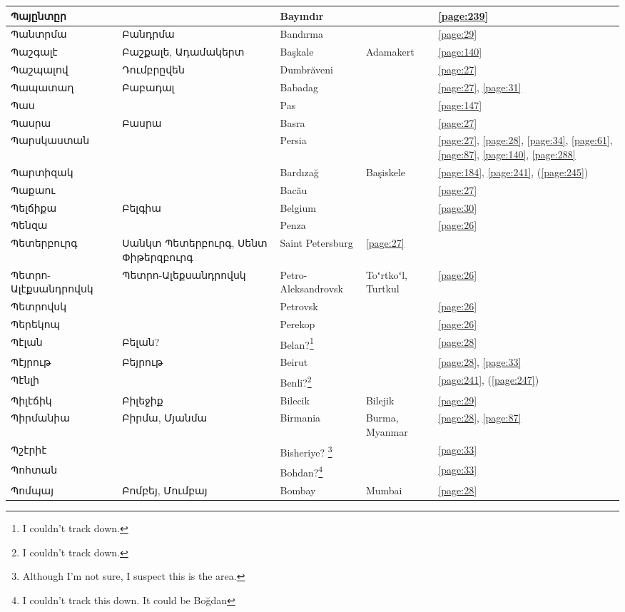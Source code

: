 \begin{center}
\begin{longtable}{|p{}|p{3cm}|p{3cm}|p{2cm}|p{3cm}|}
Պայընտըր& &Bayındır & &\ref{page:239}\\ \hline
Պանտրմա& Բանդրմա&Bandırma & &\ref{page:29}\\ \hline
Պաշգալէ& Բաշքալե,  Ադամակերտ & Başkale&Adamakert&\ref{page:140}\\ \hline
Պաշպալով& Դումբրըվեն & Dumbrăveni& &\ref{page:27}\\ \hline
Պապատաղ&Բաբադալ &Babadag & &\ref{page:27}, \ref{page:31}\\ \hline
Պաս& & Pas& &\ref{page:147}\\ \hline
Պասրա& Բասրա& Basra& &\ref{page:27}\\ \hline
Պարսկաստան& & 
Persia& &\ref{page:27}, \ref{page:28}, \ref{page:34}, \ref{page:61}, \ref{page:87}, \ref{page:140}, \ref{page:288}\\ \hline
Պարտիզակ& & Bardızağ&Başiskele   &\ref{page:184}, \ref{page:241}, (\ref{page:245})\\ \hline
Պաքաու& &Bacău & &\ref{page:27}\\ \hline
Պելճիքա&Բելգիա &Belgium & &\ref{page:30}\\ \hline
Պենզա& &Penza& &\ref{page:26}\\ \hline
Պետերբուրգ& Սանկտ Պետերբուրգ, Սենտ Փիթերզբուրգ &   Saint Petersburg  &\ref{page:27}\\ \hline
Պետրո-Ալէքսանդրովսկ&Պետրո-Ալեքսանդրովսկ & Petro-Aleksandrovsk&Toʻrtkoʻl, Turtkul &\ref{page:26}\\ \hline
Պետրովսկ& & Petrovsk& &\ref{page:26}\\ \hline
Պերեկոպ& &Perekop & &\ref{page:26}\\ \hline
Պէլան& Բելան?& Belan?\footnote{I couldn't track down. }& &\ref{page:28}\\ \hline
Պէյրութ&   Բեյրութ&Beirut & &\ref{page:28}, \ref{page:33}\\ \hline
Պէնլի& &Benli?\footnote{I couldn't track down.} & &\ref{page:241}, (\ref{page:247})\\ \hline
Պիլէճիկ&Բիլեջիք& Bilecik&Bilejik &\ref{page:29}\\ \hline
Պիրմանիա& Բիրմա, Մյանմա  &Birmania  &Burma, Myanmar &\ref{page:28}, \ref{page:87}\\ \hline
Պշէրիէ& &Bisheriye? \footnote{Although I'm not sure, I suspect this is the area.} & &\ref{page:33}\\ \hline
Պոհտան& &Bohdan?\footnote{I couldn't track this down. It could be Boğdan} & &\ref{page:33}\\ \hline
Պոմպայ& Բոմբեյ, Մումբայ&      Bombay  &Mumbai &\ref{page:28}\\ \hline

\end{longtable}
\end{center}
